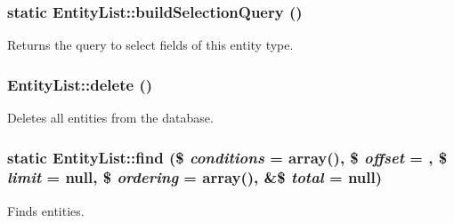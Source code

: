 \hypertarget{classEntityList_a9780f5f54e8f05f04e152685aa6a443d}{
\subsubsection[{buildSelectionQuery}]{\setlength{\rightskip}{0pt plus 5cm}static EntityList::buildSelectionQuery ()}}
\label{classEntityList_a9780f5f54e8f05f04e152685aa6a443d}
Returns the query to select fields of this entity type. \hypertarget{classEntityList_a9c027ff7f947b077129e0f4bdaaa3c08}{
\subsubsection[{delete}]{\setlength{\rightskip}{0pt plus 5cm}EntityList::delete ()}}
\label{classEntityList_a9c027ff7f947b077129e0f4bdaaa3c08}
Deletes all entities from the database. \hypertarget{classEntityList_ab4cbc27b6e608cddff7c8e7b7e852bbc}{
\subsubsection[{find}]{\setlength{\rightskip}{0pt plus 5cm}static EntityList::find (\$ {\em conditions} = {\ttfamily array()}, \/  \$ {\em offset} = {}, \/  \$ {\em limit} = {\ttfamily null}, \/  \$ {\em ordering} = {\ttfamily array()}, \/  \&\$ {\em total} = {\ttfamily null})}}
\label{classEntityList_ab4cbc27b6e608cddff7c8e7b7e852bbc}
Finds entities.


